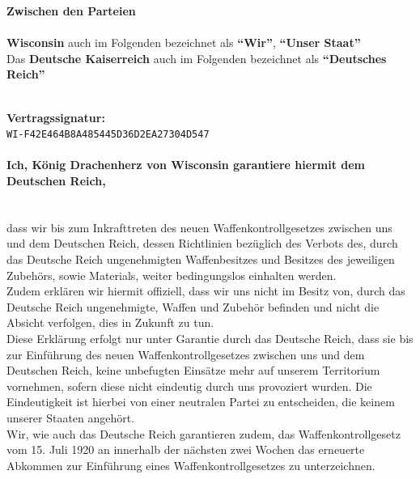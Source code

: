 \documentclass{article}
\begin{document}
\begin{center}
\begin{minipage}{0.45\textwidth}
    \end{minipage}
\end{center}


\begin{center}
    \textbf{Zwischen den Parteien\\}\textbf{\\}
    \textbf{Wisconsin} auch im Folgenden bezeichnet als \textbf{``Wir''}, \textbf{``Unser Staat''\\}
    Das \textbf{Deutsche Kaiserreich} auch im Folgenden bezeichnet als \textbf{``Deutsches Reich''\\}
    \textbf{\\}

\end{center}
\newpage
{}
\vspace*{\fill}
\begin{Center}
\textbf{Vertragssignatur:\\}
\texttt{WI-F42E464B8A485445D36D2EA27304D547}
\vspace*{\fill}
\end{Center}
\newpage
\vspace*{\fill}
\paragraph{Ich, König Drachenherz von Wisconsin garantiere hiermit dem Deutschen Reich,\\\\}
dass wir bis zum Inkrafttreten des neuen Waffenkontrollgesetzes zwischen uns und dem Deutschen Reich,
dessen Richtlinien bezüglich des Verbots des, durch das Deutsche Reich ungenehmigten Waffenbesitzes und Besitzes
des jeweiligen Zubehörs, sowie Materials, weiter bedingungslos einhalten werden.\\
Zudem erklären wir hiermit offiziell, dass wir uns nicht im Besitz von, durch das Deutsche Reich ungenehmigte,
Waffen und Zubehör befinden und nicht die Absicht verfolgen, dies in Zukunft zu tun.\\
Diese Erklärung erfolgt nur unter Garantie durch das Deutsche Reich, dass sie bis zur Einführung des neuen Waffenkontrollgesetzes
zwischen uns und dem Deutschen Reich, keine unbefugten Einsätze mehr auf unserem Territorium vornehmen, sofern diese nicht eindeutig durch uns provoziert wurden. Die Eindeutigkeit ist hierbei von einer neutralen Partei zu entscheiden, die keinem unserer Staaten angehört.\\
Wir, wie auch das Deutsche Reich garantieren zudem, das Waffenkontrollgesetz vom 15. Juli 1920 an innerhalb der nächsten zwei Wochen das erneuerte Abkommen zur Einführung eines Waffenkontrollgesetzes zu unterzeichnen.
\vspace*{\fill}
\end{document}
